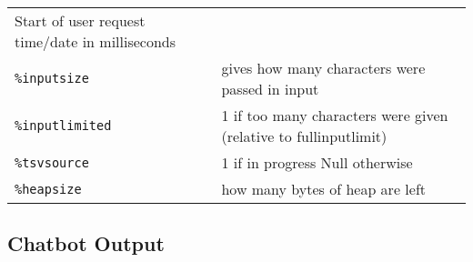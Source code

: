 \documentclass[]{article}
\begin{document}
\begin{longtable}[]{@{}ll@{}}
\begin{minipage}[t]{0.10\columnwidth}
Start of user request time/date in milliseconds\strut
\end{minipage}\tabularnewline
\begin{minipage}[t]{0.26\columnwidth}\raggedright\strut
\texttt{\%inputsize}\strut
\end{minipage} & \begin{minipage}[t]{0.10\columnwidth}\raggedright\strut
gives how many characters were passed in input\strut
\end{minipage}\tabularnewline
\begin{minipage}[t]{0.26\columnwidth}\raggedright\strut
\texttt{\%inputlimited}\strut
\end{minipage} & \begin{minipage}[t]{0.10\columnwidth}\raggedright\strut
1 if too many characters were given (relative to fullinputlimit)\strut
\end{minipage}\tabularnewline
\begin{minipage}[t]{0.26\columnwidth}\raggedright\strut
\texttt{\%tsvsource}\strut
\end{minipage} & \begin{minipage}[t]{0.10\columnwidth}\raggedright\strut
1 if in progress Null otherwise\strut
\end{minipage}\tabularnewline
\begin{minipage}[t]{0.26\columnwidth}\raggedright\strut
\texttt{\%heapsize}\strut
\end{minipage} & \begin{minipage}[t]{0.10\columnwidth}\raggedright\strut
how many bytes of heap are left\strut
\end{minipage}\tabularnewline
\bottomrule
\end{longtable}

\subsection{Chatbot Output}\label{chatbot-output}
\end{document}
